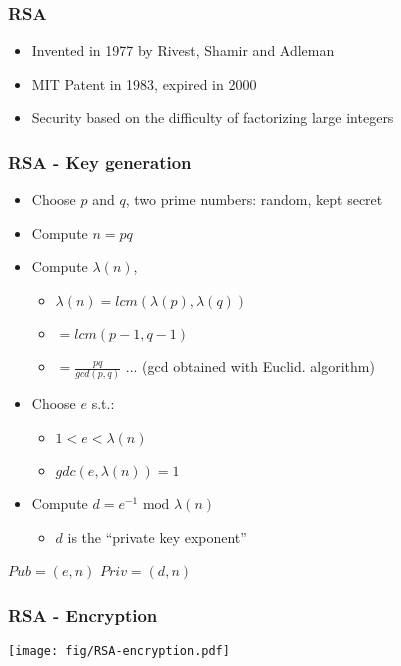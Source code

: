 \documentclass[
hyperref={pdfpagelabels=false}
,xcolor=table
]
{beamer}
\begin{document}
\begin{frame}
  \frametitle{RSA}
  \begin{itemize}
  \item Invented in 1977 by Rivest, Shamir and Adleman
  \item MIT Patent in 1983, expired in 2000
  \item Security based on the difficulty of factorizing large integers
  \end{itemize}
\end{frame}


\begin{frame}
  \frametitle{RSA - Key generation}

  \begin{itemize}
  \item Choose $p$ and $q$, two prime numbers: random, kept secret
  \item Compute $n = pq$
  \item Compute $\lambda(n)$,
    \begin{itemize}
    \item $\lambda(n) = lcm(\lambda(p), \lambda(q))$
    \item $= lcm(p-1, q-1)$
    \item $= \frac{pq}{gcd(p,q)}$ ... (gcd obtained with Euclid. algorithm)
    \end{itemize}
  \item Choose $e$ s.t.:
    \begin{itemize}
    \item $1 < e < \lambda(n)$
    \item $gdc(e,\lambda(n))=1$
    \end{itemize}
  \item Compute $d = e^{-1} \mbox{ mod } \lambda(n)$
    \begin{itemize}
    \item $d$ is the ``private key exponent''
    \end{itemize}
  \end{itemize}

  \begin{tcolorbox}[colframe=Myred]
    $Pub = (e,n)$ \hfill $Priv = (d,n)$
  \end{tcolorbox}  
\end{frame}


\begin{frame}
  \frametitle{RSA - Encryption}

  \begin{center}
    \texttt{[image: fig/RSA-encryption.pdf]}
  \end{center}
  
\end{frame}
\end{document}
